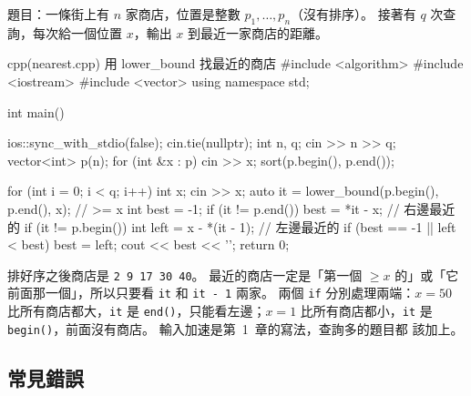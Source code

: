 題目：一條街上有 $n$ 家商店，位置是整數 $p_1, \dots, p_n$（沒有排序）。
接著有 $q$ 次查詢，每次給一個位置 $x$，輸出 $x$ 到最近一家商店的距離。

\begin{example}[label=ex:nearest]{cpp}{(nearest.cpp) 用 lower\_bound 找最近的商店}
#include <algorithm>
#include <iostream>
#include <vector>
using namespace std;

int main() {
    ios::sync_with_stdio(false);
    cin.tie(nullptr);
    int n, q;
    cin >> n >> q;
    vector<int> p(n);
    for (int &x : p) {
        cin >> x;
    }
    sort(p.begin(), p.end());

    for (int i = 0; i < q; i++) {
        int x;
        cin >> x;
        auto it = lower_bound(p.begin(), p.end(), x);  // >= x
        int best = -1;
        if (it != p.end()) {
            best = *it - x;              // 右邊最近的
        }
        if (it != p.begin()) {
            int left = x - *(it - 1);    // 左邊最近的
            if (best == -1 || left < best) {
                best = left;
            }
        }
        cout << best << '\n';
    }
    return 0;
}
\end{example}


排好序之後商店是 \texttt{2 9 17 30 40}。 最近的商店一定是「第一個 $\ge x$
的」或「它前面那一個」，所以只要看 \texttt{it} 和 \texttt{it - 1} 兩家。
兩個 \texttt{if} 分別處理兩端：$x = 50$ 比所有商店都大，\texttt{it} 是
\texttt{end()}，只能看左邊；$x = 1$ 比所有商店都小，\texttt{it} 是
\texttt{begin()}，前面沒有商店。 輸入加速是第~1~章的寫法，查詢多的題目都
該加上。

\subsection{常見錯誤}


